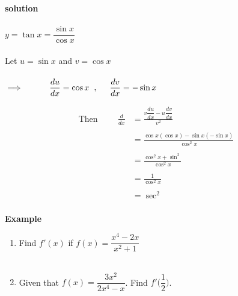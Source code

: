 \documentclass[11pt,a4paper]{article}
\begin{document}
\textbf{solution}\\\\
$y=\tan x = \dfrac{\sin x}{\cos x}$\\\\
Let $u=\sin x$ and $v=\cos x$\\\\
$\implies \hspace{1cm} \dfrac{du}{dx}=\cos x\hspace{0.2cm},\hspace{0.5cm} \dfrac{dv}{dx}=-\sin x$

\begin{align*}
\text{Then}\hspace{1cm}  \frac{d}{dx} &=\frac{v\dfrac{du}{dx}-u\dfrac{dv}{dx}}{v^2}\\\\
& =\frac{\cos x (\cos x)-\sin x(-\sin x)}{\cos^2x}\\\\
& = \frac{\cos^2 x+\sin^2}{\cos^2x}\\\\
& = \frac{1}{\cos^2x}\\\\
& = \sec^2\\
\end{align*}


\textbf{Example}
\begin{enumerate}
\item Find $f'(x)$ if $f(x)=\dfrac{x^4-2x}{x^2+1}$\\\
\item Given that $f(x)=\dfrac{3x^2}{2x^4-x}$. Find $f'\bigg(\dfrac{1}{2}\bigg)$.\\
\end{enumerate}
\end{document}
